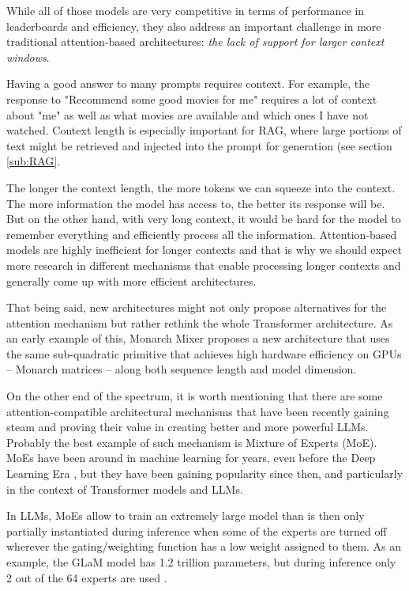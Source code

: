 \documentclass[conference]{IEEEtran}
\begin{document}
While all of those models are very competitive in terms of performance in leaderboards and efficiency, they also address an important challenge in more traditional attention-based architectures: \emph{the lack of support for larger context windows}.

Having a good answer to many prompts requires context. For example, the response to "Recommend some good movies for me" requires a lot of context about "me" as well as what movies are available and which ones I have not watched. Context length is especially important for RAG, where large portions of text might be retrieved and injected into the prompt for generation (see section \ref{sub:RAG}.

The longer the context length, the more tokens we can squeeze into the context. The more information the model has access to, the better its response will be. But on the other hand, with very long context, it would be hard for the model to remember everything and efficiently process all the information. Attention-based models are highly inefficient for longer contexts and that is why we should expect more research in different mechanisms that enable processing longer contexts and generally come up with more efficient architectures.

That being said, new architectures might not only propose alternatives for the attention mechanism but rather rethink the whole Transformer architecture. As an early example of this, Monarch Mixer \cite{fu2023monarch} proposes a new architecture that uses the same sub-quadratic primitive that achieves high hardware efficiency on GPUs -- Monarch matrices -- along both sequence length and model dimension.

On the other end of the spectrum, it is worth mentioning that there are some attention-compatible architectural mechanisms that have been recently gaining steam and proving their value in creating better and more powerful LLMs. Probably the best example of such mechanism is Mixture of Experts (MoE). MoEs have been around in machine learning for years, even before the Deep Learning Era \cite{mclachlan2019finite}, but they have been gaining popularity since then, and particularly in the context of Transformer models and LLMs. 

In LLMs, MoEs allow to train an extremely large model than is then only partially instantiated during inference when some of the experts are turned off wherever the gating/weighting function has a low weight assigned to them. As an example, the GLaM model has 1.2 trillion parameters, but during inference only 2 out of the 64 experts are used \cite{du2022glam}.
\end{document}
